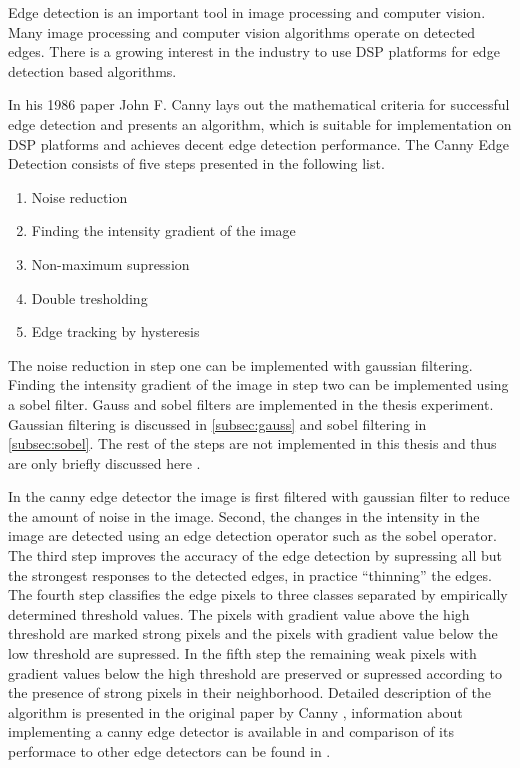 Edge detection is an important tool in image processing and computer vision. Many image processing and computer vision algorithms operate on detected edges. There is a growing interest in the industry to use DSP platforms for edge detection based algorithms. 

In his 1986 paper John F. Canny \cite{canny1986computational} lays out the mathematical criteria for successful edge detection and presents an algorithm, which is suitable for implementation on DSP platforms and achieves decent edge detection performance. The Canny Edge Detection consists of five steps presented in the following list.

\begin{enumerate}
    \item{Noise reduction}
    \item{Finding the intensity gradient of the image}
    \item{Non-maximum supression}
    \item{Double tresholding}
    \item{Edge tracking by hysteresis}
\end{enumerate}

The noise reduction in step one can be implemented with gaussian filtering. Finding the intensity gradient of the image in step two can be implemented using a sobel filter. Gauss and sobel filters are implemented in the thesis experiment. Gaussian filtering is discussed in \ref{subsec:gauss} and sobel filtering in \ref{subsec:sobel}. The rest of the steps are not implemented in this thesis and thus are only briefly discussed here .

In the canny edge detector the image is first filtered with gaussian filter to reduce the amount of noise in the image. Second, the changes in the intensity in the image are detected using an edge detection operator such as the sobel operator. The third step improves the accuracy of the edge detection by supressing all but the strongest responses to the detected edges, in practice ``thinning'' the edges. The fourth step classifies the edge pixels to three classes separated by empirically determined threshold values. The pixels with gradient value above the high threshold are marked strong pixels and the pixels with gradient value below the low threshold are supressed. In the fifth step the remaining weak pixels with gradient values below the high threshold are preserved or supressed according to the presence of strong pixels in their neighborhood. Detailed description of the algorithm is presented in the original paper by Canny \cite{canny1986computational}, information about implementing a canny edge detector is available in \cite{gonzalez2008digital} and comparison of its performace to other edge detectors can be found in \cite{maini2009study}.
